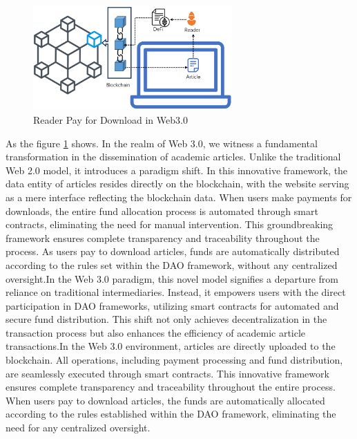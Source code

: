 \documentclass[lettersize,journal]{IEEEtran}
\begin{document}
\begin{figure}[h]
  \centering
  \includegraphics[width=3in]{assets/web3.png}
  \caption{Reader Pay for Download in Web3.0}
  \label{fig:web3}
\end{figure}



As the figure \ref{fig:web3} shows. In the realm of Web 3.0, we witness a fundamental transformation in the dissemination of academic articles. Unlike the traditional Web 2.0 model, it introduces a paradigm shift. In this innovative framework, the data entity of articles resides directly on the blockchain, with the website serving as a mere interface reflecting the blockchain data. When users make payments for downloads, the entire fund allocation process is automated through smart contracts, eliminating the need for manual intervention. This groundbreaking framework ensures complete transparency and traceability throughout the process. As users pay to download articles, funds are automatically distributed according to the rules set within the DAO framework, without any centralized oversight.In the Web 3.0 paradigm, this novel model signifies a departure from reliance on traditional intermediaries. Instead, it empowers users with the direct participation in DAO frameworks, utilizing smart contracts for automated and secure fund distribution. This shift not only achieves decentralization in the transaction process but also enhances the efficiency of academic article transactions.In the Web 3.0 environment, articles are directly uploaded to the blockchain. All operations, including payment processing and fund distribution, are seamlessly executed through smart contracts. This innovative framework ensures complete transparency and traceability throughout the entire process. When users pay to download articles, the funds are automatically allocated according to the rules established within the DAO framework, eliminating the need for any centralized oversight.
\end{document}
